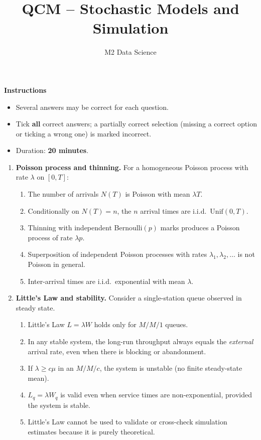 \documentclass[a4paper,11pt]{article}
\title{QCM -- Stochastic Models and Simulation}
\author{M2 Data Science}
\date{}
\begin{document}
\maketitle

\noindent\textbf{Instructions}
\begin{itemize}
  \item Several answers may be correct for each question.
  \item Tick \textbf{all} correct answers; a partially correct selection (missing a correct option or ticking a wrong one) is marked incorrect.
  \item Duration: \textbf{20 minutes}.
\end{itemize}

\bigskip

\begin{enumerate}
\item \textbf{Poisson process and thinning.} For a homogeneous Poisson process with rate $\lambda$ on $[0,T]$:
  \begin{enumerate}
    \item The number of arrivals $N(T)$ is Poisson with mean $\lambda T$.
    \item Conditionally on $N(T)=n$, the $n$ arrival times are i.i.d.\ $\mathrm{Unif}(0,T)$.
    \item Thinning with independent Bernoulli$(p)$ marks produces a Poisson process of rate $\lambda p$.
    \item Superposition of independent Poisson processes with rates $\lambda_1,\lambda_2,\dots$ is not Poisson in general.
    \item Inter-arrival times are i.i.d.\ exponential with mean $\lambda$.
  \end{enumerate}

\item \textbf{Little’s Law and stability.} Consider a single-station queue observed in steady state.
  \begin{enumerate}
    \item Little’s Law $L=\lambda W$ holds only for $M/M/1$ queues.
    \item In any stable system, the long-run throughput always equals the \emph{external} arrival rate, even when there is blocking or abandonment.
    \item If $\lambda \ge c\mu$ in an $M/M/c$, the system is unstable (no finite steady-state mean).
    \item $L_q = \lambda W_q$ is valid even when service times are non-exponential, provided the system is stable.
    \item Little’s Law cannot be used to validate or cross-check simulation estimates because it is purely theoretical.
  \end{enumerate}


\end{enumerate}
\end{document}
